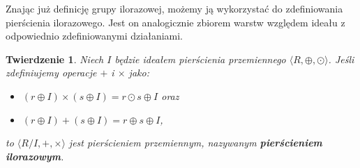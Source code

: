 \documentclass[declaration,shortabstract]{iithesis}
\theoremstyle{definition}
\theoremstyle{remark} \newtheorem{observation}{Obserwacja}
\theoremstyle{plain} \newtheorem{theorem}{Twierdzenie}
\theoremstyle{plain} \newtheorem{lemma}{Lemat}
\theoremstyle{remark} \newtheorem*{remark*}{Uwaga}
\theoremstyle{reminder} \newtheorem*{reminder*}{Przypomnienie}
\begin{document}
Znając już definicję grupy ilorazowej, możemy ją wykorzystać do zdefiniowania pierścienia ilorazowego. Jest on analogicznie zbiorem warstw względem ideału z odpowiednio zdefiniowanymi działaniami.

\begin{theorem}
	Niech $I$ będzie ideałem pierścienia przemiennego $\langle R, \oplus, \odot \rangle$. Jeśli zdefiniujemy operacje $+$ i $\times$ jako: 
	\begin{itemize}[leftmargin=.4in]
		\item $(r \oplus I) \times (s \oplus I) = r \odot s \oplus I$ oraz
		\item $(r \oplus I) + (s \oplus I) = r \oplus s \oplus I$,
	\end{itemize}
	to $\langle R/I, +, \times \rangle$ jest pierścieniem przemiennym, nazywanym \textbf{\textit{pierścieniem ilorazowym}}.
\end{theorem}

\end{document}
